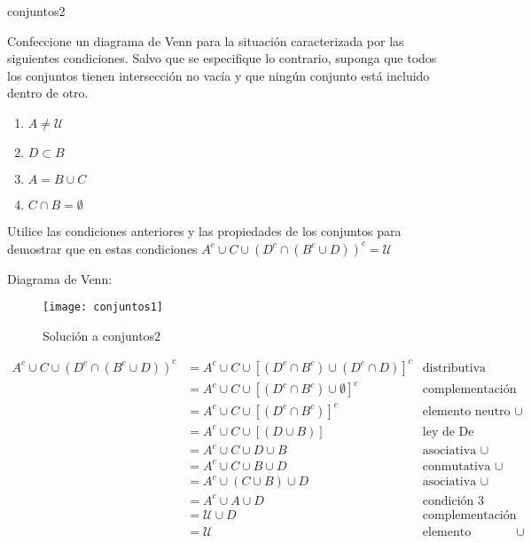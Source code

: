 \begin{defproblem}{conjuntos2}%
	\begin{onlyproblem}%
		Confeccione un diagrama de Venn para la situación caracterizada por las siguientes condiciones. Salvo que se especifique lo contrario, suponga que todos los conjuntos tienen intersección no vacía y que ningún conjunto está incluido dentro de otro.
		
		\begin{enumerate}
			\item $ A \neq \mathcal{U} $
			\item $ D \subset B $
			\item $ A = B \cup C $
			\item $ C \cap B = \emptyset $
		\end{enumerate}
		
		Utilice las condiciones anteriores y las propiedades de los conjuntos para demostrar que en estas condiciones $ A^c \cup C \cup (D^c \cap (B^c \cup D))^c = \mathcal{U} $
	\end{onlyproblem}%
	\begin{onlysolution}%
		Diagrama de Venn:
		
		\begin{figure}
			\texttt{[image: conjuntos1]}
			\caption[Solución a conjuntos2]{Solución a conjuntos2}
			\label{fig:conjuntos2-solucion}
		\end{figure}
	
		\begin{align*}
		A^c \cup C \cup (D^c \cap (B^c \cup D))^c & = A^c \cup C \cup [(D^c \cap B^c) \cup (D^c \cap D)]^c &  \text{distributiva} \\	
		& = A^c \cup C \cup [(D^c \cap B^c) \cup \emptyset]^c & \text{complementación} \\
		& = A^c \cup C \cup [(D^c \cap B^c)]^c & \text{elemento neutro } \cup \\
		& = A^c \cup C \cup [(D \cup B)] & \text{ley de De Morgan} \\
		& = A^c \cup C \cup D \cup B & \text{asociativa } \cup \\
		& = A^c \cup C \cup B \cup D & \text{conmutativa } \cup \\
		& = A^c \cup (C \cup B) \cup D & \text{asociativa } \cup \\
		& = A^c \cup A \cup D & \text{condición }3 \\
		& = \mathcal{U} \cup D & \text{complementación} \\
		& = \mathcal{U} & \text{elemento absorbente } \cup
		\end{align*}
	\end{onlysolution}%
\end{defproblem}

